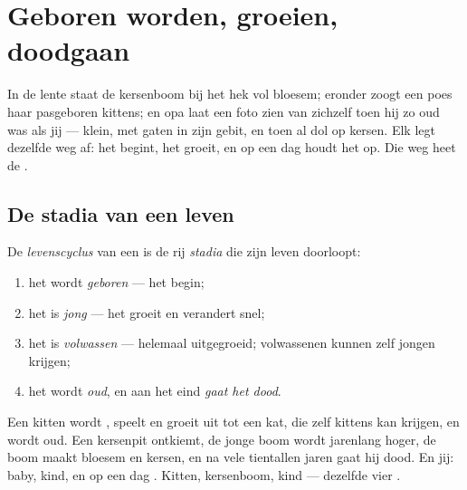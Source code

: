\chapter{Geboren worden, groeien, doodgaan}\label{ch:g2:born-grow-die}

In de lente staat de kersenboom bij het hek vol bloesem; eronder zoogt
een poes haar pasgeboren kittens; en opa laat een foto zien van
zichzelf toen hij zo oud was als jij --- klein, met gaten in zijn
gebit, en toen al dol op kersen. Elk  legt dezelfde weg af:
het begint, het groeit, en op een dag houdt het op. Die weg heet de
.

\section{De stadia van een leven}

\begin{definition}[Levenscyclus]\label{def:g2:born-grow-die:cycle}
De \emph{levenscyclus} van een  is de
rij \emph{stadia} die zijn leven doorloopt:
\begin{enumerate}
  \item het wordt \emph{geboren} --- het begin;
  \item het is \emph{jong} --- het groeit en verandert snel;
  \item het is \emph{volwassen} --- helemaal
        uitgegroeid; volwassenen kunnen zelf jongen krijgen;
  \item het wordt \emph{oud}, en aan het eind
        \emph{gaat het dood}.
\end{enumerate}
\end{definition}

\begin{example}\label{ex:g2:born-grow-die:three}
Een kitten wordt , speelt en groeit uit tot een kat, die zelf
kittens kan krijgen, en wordt oud. Een kersenpit ontkiemt, de jonge
boom wordt jarenlang hoger, de  boom maakt bloesem en kersen,
en na vele tientallen jaren gaat hij dood. En jij: baby, kind, en op
een dag . Kitten, kersenboom, kind --- dezelfde vier .
\end{example}

